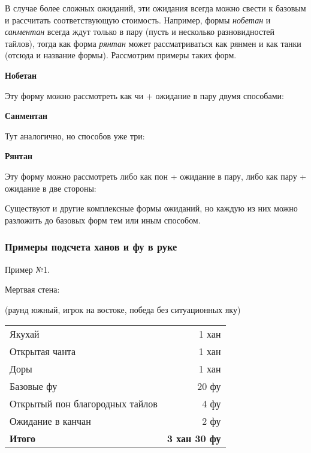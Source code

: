 В случае более сложных ожиданий, эти ожидания всегда можно свести к базовым и рассчитать соответствующую стоимость. Например, формы \textit{нобетан} и \textit{санментан} всегда ждут только в пару (пусть и несколько разновидностей тайлов), тогда как форма \textit{рянтан} может рассматриваться как рянмен и как танки (отсюда и название формы). Рассмотрим примеры таких форм.

\textbf{Нобетан}


Эту форму можно рассмотреть как чи + ожидание в пару двумя способами:



\textbf{Санментан}


Тут аналогично, но способов уже три:




\textbf{Рянтан}


Эту форму можно рассмотреть либо как пон + ожидание в пару, либо как пару + ожидание в две стороны:



Существуют и другие комплексные формы ожиданий, но каждую из них можно разложить до базовых форм тем или иным способом.

\subsubsection{Примеры подсчета ханов и фу в руке}

Пример №1.

\hfill {}

Мертвая стена:

(раунд южный, игрок на востоке, победа без ситуационных яку)

\noindent\begin{tabular}{lr}
	Якухай & 1 хан \\
	Открытая чанта & 1 хан \\
	Доры & 1 хан \\
	Базовые фу & 20 фу \\
	Открытый пон благородных тайлов & 4 фу \\
	Ожидание в канчан & 2 фу \\
	\midrule
	\textbf{Итого} & \textbf{3 хан 30 фу} \\
\end{tabular}

